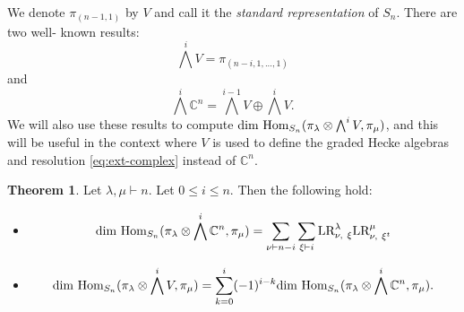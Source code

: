 \documentclass[11pt]{amsart}
\numberwithin{equation}{section}
\theoremstyle{definition}
\newtheorem{theorem}[thm]{Theorem}
\begin{document}
We denote $\pi_{(n-1,1)}$ by $V$ and call it the \emph{standard representation} of $S_{n}$. There are two well-
known results:
\[ \bigwedge^{i}V=\pi_{(n-i,1,...,1)}\] and 
\[\bigwedge^{i}\mathbb{C}^{n}=\bigwedge^{i-1}V\oplus\bigwedge^{i}V.\]
We will also use these results to compute $ \textnormal{dim}\ \textnormal{Hom}_{S_{n}}(\pi_{\lambda}\otimes\bigwedge^{i}V, \pi_{\mu})$, and this will be useful in the context where $V$ is used to define the graded Hecke algebras and resolution \ref{eq:ext-complex} instead of \(\mathbb C^n\).


\begin{theorem}\cite[Theorem 3.5]{hayashi2015decomposition}\label{hayashi theorem} Let \(\lambda, \mu \vdash n\). Let \(0 \leq i \leq n\). Then the following hold:
    \begin{itemize}
    \item[(1)] 
        \begin{equation*}
           \textnormal{dim}\ \textnormal{Hom}_{S_{n}}(\pi_{\lambda}\otimes\bigwedge^{i}\mathbb{C}^{n}, \pi_{\mu})= \sum\limits_{\nu\vdash n-i}\sum\limits_{\xi\vdash i} \textnormal{LR}^{\lambda}_{\nu,\ \xi}\textnormal{LR}^{\mu}_{\nu,\ \xi^{t}}
        \end{equation*}
    \item[(2)] 
        \begin{equation*}
             \textnormal{dim}\ \textnormal{Hom}_{S_{n}}(\pi_{\lambda}\otimes\bigwedge^{i}V, \pi_{\mu})= \sum_{k=0}^{i}(-1)^{i-k} \textnormal{dim}\ \textnormal{Hom}_{S_{n}}(\pi_{\lambda}\otimes\bigwedge^{i}\mathbb{C}^{n}, \pi_{\mu}).
        \end{equation*}
    \end{itemize}
\end{theorem}
\end{document}
